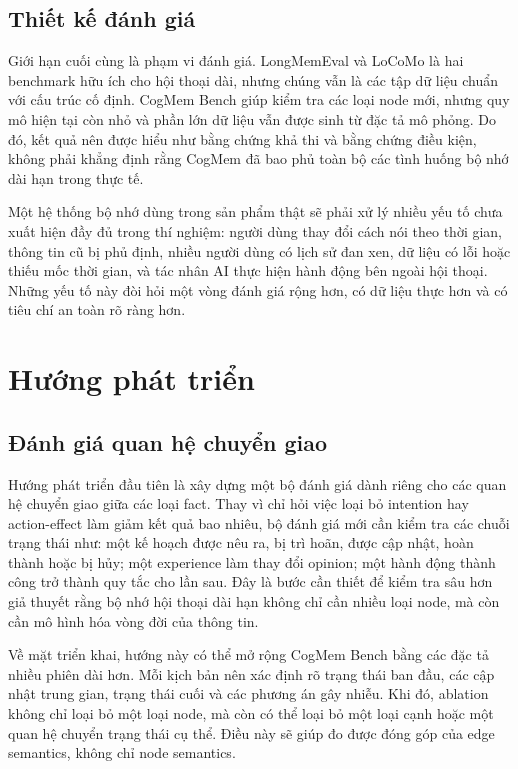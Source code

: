 \documentclass[../main.tex]{subfiles}
\begin{document}
\subsection{Thiết kế đánh giá}

Giới hạn cuối cùng là phạm vi đánh giá. LongMemEval và LoCoMo là hai benchmark hữu ích cho hội thoại dài, nhưng chúng vẫn là các tập dữ liệu chuẩn với cấu trúc cố định. CogMem Bench giúp kiểm tra các loại node mới, nhưng quy mô hiện tại còn nhỏ và phần lớn dữ liệu vẫn được sinh từ đặc tả mô phỏng. Do đó, kết quả nên được hiểu như bằng chứng khả thi và bằng chứng điều kiện, không phải khẳng định rằng CogMem đã bao phủ toàn bộ các tình huống bộ nhớ dài hạn trong thực tế.

Một hệ thống bộ nhớ dùng trong sản phẩm thật sẽ phải xử lý nhiều yếu tố chưa xuất hiện đầy đủ trong thí nghiệm: người dùng thay đổi cách nói theo thời gian, thông tin cũ bị phủ định, nhiều người dùng có lịch sử đan xen, dữ liệu có lỗi hoặc thiếu mốc thời gian, và tác nhân AI thực hiện hành động bên ngoài hội thoại. Những yếu tố này đòi hỏi một vòng đánh giá rộng hơn, có dữ liệu thực hơn và có tiêu chí an toàn rõ ràng hơn.

\section{Hướng phát triển}

\subsection{Đánh giá quan hệ chuyển giao}

Hướng phát triển đầu tiên là xây dựng một bộ đánh giá dành riêng cho các quan hệ chuyển giao giữa các loại fact. Thay vì chỉ hỏi việc loại bỏ intention hay action-effect làm giảm kết quả bao nhiêu, bộ đánh giá mới cần kiểm tra các chuỗi trạng thái như: một kế hoạch được nêu ra, bị trì hoãn, được cập nhật, hoàn thành hoặc bị hủy; một experience làm thay đổi opinion; một hành động thành công trở thành quy tắc cho lần sau. Đây là bước cần thiết để kiểm tra sâu hơn giả thuyết rằng bộ nhớ hội thoại dài hạn không chỉ cần nhiều loại node, mà còn cần mô hình hóa vòng đời của thông tin.

Về mặt triển khai, hướng này có thể mở rộng CogMem Bench bằng các đặc tả nhiều phiên dài hơn. Mỗi kịch bản nên xác định rõ trạng thái ban đầu, các cập nhật trung gian, trạng thái cuối và các phương án gây nhiễu. Khi đó, ablation không chỉ loại bỏ một loại node, mà còn có thể loại bỏ một loại cạnh hoặc một quan hệ chuyển trạng thái cụ thể. Điều này sẽ giúp đo được đóng góp của edge semantics, không chỉ node semantics.
\end{document}
